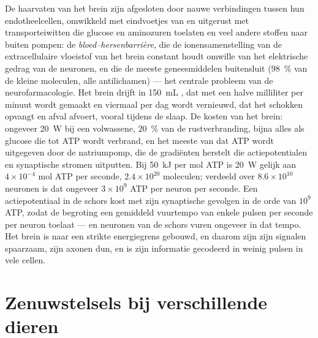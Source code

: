 \begin{proposition}\label{prop:b3:nervous-systems:barrier-budget}
De haarvaten van het brein zijn afgesloten door nauwe verbindingen
tussen hun endotheelcellen, omwikkeld met eindvoetjes van  en
uitgerust met transporteiwitten die glucose en aminozuren toelaten en
veel andere stoffen naar buiten pompen: de
\emph{bloed--hersenbarrière}, die de ionensamenstelling van de
extracellulaire vloeistof van het brein constant houdt omwille van het
elektrische gedrag van de neuronen, en die de meeste geneesmiddelen
buitensluit (\qty{98}{\%} van de kleine moleculen, alle antilichamen)
--- het centrale probleem van de neurofarmacologie. Het brein drijft in
\qty{150}{mL} \emph{}, dat met een halve milliliter per
minuut wordt gemaakt en viermaal per dag wordt vernieuwd, dat het
schokken opvangt en afval afvoert, vooral tijdens de slaap. De kosten
van het brein: ongeveer \qty{20}{W} bij een volwassene, \qty{20}{\%}
van de rustverbranding, bijna alles als glucose die tot ATP wordt
verbrand, en het meeste van dat ATP wordt uitgegeven door de
natriumpomp, die de gradiënten herstelt die actiepotentialen en
synaptische stromen uitputten. Bij \qty{50}{kJ} per mol ATP is
\qty{20}{W} gelijk aan $4\times 10^{-4}$ mol ATP per seconde,
$2.4\times 10^{20}$ moleculen; verdeeld over $8.6\times 10^{10}$
neuronen is dat ongeveer $3\times 10^{9}$ ATP per neuron per seconde.
Een actiepotentiaal in de schors kost met zijn synaptische gevolgen in
de orde van $10^{9}$ ATP, zodat de begroting een gemiddeld vuurtempo
van enkele pulsen per seconde per neuron toelaat --- en neuronen van de
schors vuren ongeveer in dat tempo. Het brein is naar een strikte
energiegrens gebouwd, en daarom zijn zijn signalen spaarzaam, zijn
axonen dun, en is zijn informatie gecodeerd in weinig pulsen in vele
cellen.
\end{proposition}
\admitted

\section{Zenuwstelsels bij verschillende dieren}


